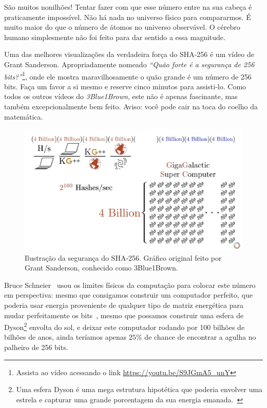 São muitos nonilhões! Tentar fazer com que esse número entre na sua cabeça é praticamente impossível. Não há nada no universo físico para compararmos. É muito maior do que o número de átomos no universo observável. O cérebro humano simplesmente não foi feito para dar sentido a essa magnitude.

\newpage

Uma das melhores visualizações da verdadeira força do SHA-256 é um vídeo de Grant Sanderson. Apropriadamente nomeado \textit{\enquote{Quão forte é a segurança de 256 bits?}}\footnote{Assista ao vídeo acessando o link \url{https://youtu.be/S9JGmA5_unY}}, onde ele mostra maravilhosamente o quão grande é um número de 256 bits. Faça um favor a si mesmo e reserve cinco minutos para assisti-lo. Como todos os outros vídeos do \textit{3Blue1Brown}, este não é apenas fascinante, mas também excepcionalmente bem feito. Aviso: você pode cair na toca do coelho da matemática.

\begin{figure}
  \includegraphics{assets/images/youtube-vid-inverted.png}
  \caption{Ilustração da segurança do SHA-256. Gráfico original feito por Grant Sanderson, conhecido como 3Blue1Brown.}
  \label{fig:youtube-vid-inverted}
\end{figure}

Bruce Schneier~\cite{web:schneier} usou os limites físicos da computação para colocar este número em perspectiva: mesmo que consigamos construir um computador perfeito, que poderia usar energia proveniente de qualquer tipo de matriz energética para mudar perfeitamente os bits~\cite{wiki:landauer}, mesmo que possamos construir uma esfera de Dyson\footnote{Uma esfera Dyson é uma mega estrutura hipotética que poderia envolver uma estrela e capturar uma grande porcentagem da sua energia emanada.~\cite{wiki:dyson}} envolta do sol, e deixar este computador rodando por 100 bilhões de bilhões de anos, ainda teríamos apenas $25\%$ de chance de encontrar a agulha no palheiro de 256 bits.

